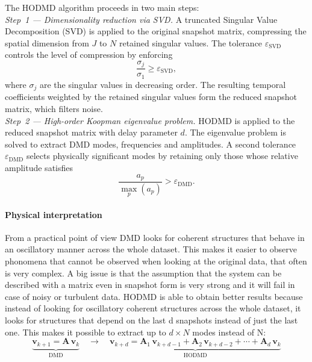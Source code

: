 The HODMD algorithm proceeds in two main steps:\\
\emph{Step~1 — Dimensionality reduction via SVD.}\label{subsec:svd_dmd}
A truncated Singular Value Decomposition (SVD) is applied to the original snapshot matrix, compressing the spatial dimension from $J$ to $N$ retained singular values.
The tolerance $\varepsilon_{\mathrm{SVD}}$ controls the level of compression by enforcing
\begin{equation}
    \frac{\sigma_j}{\sigma_1} \geq \varepsilon_{\mathrm{SVD}},
    \label{eq:svd_trunc}
\end{equation}
where $\sigma_j$ are the singular values in decreasing order.
The resulting temporal coefficients weighted by the retained singular values form the reduced snapshot matrix, which filters noise.\\
\emph{Step~2 — High-order Koopman eigenvalue problem.}
HODMD is applied to the reduced snapshot matrix with delay parameter $d$.
The eigenvalue problem is solved to extract DMD modes, frequencies and amplitudes.
A second tolerance $\varepsilon_{\mathrm{DMD}}$ selects physically significant modes by retaining only those whose relative amplitude satisfies
\begin{equation}
    \frac{a_p}{\max_p(a_p)} > \varepsilon_{\mathrm{DMD}}.
    \label{eq:dmd_trunc}
\end{equation}

\paragraph{Physical interpretation}

From a practical point of view DMD looks for coherent structures that behave in an oscillatory manner across the whole dataset. This makes it easier to observe phonomena that cannot be observed when looking at the original data, that often is very complex. A big issue is that the assumption that the system can be described with a matrix even in snapshot form is very strong and it will fail in case of noisy or turbulent data.
HODMD is able to obtain better results because instead of looking for oscillatory coherent structures across the whole dataset, it looks for structures that depend on the last d snapshots instead of just the last one. This makes it possible to extract up to $d \times N$  modes instead of N:
\begin{equation*}
\underbrace{\mathbf{v}_{k+1} = \mathbf{A}\,\mathbf{v}_k}_{\text{DMD}}
\quad \longrightarrow \quad
\underbrace{\mathbf{v}_{k+d} = \mathbf{A}_1\,\mathbf{v}_{k+d-1} + \mathbf{A}_2\,\mathbf{v}_{k+d-2} + \cdots + \mathbf{A}_d\,\mathbf{v}_k}_{\text{HODMD}}
\end{equation*}

